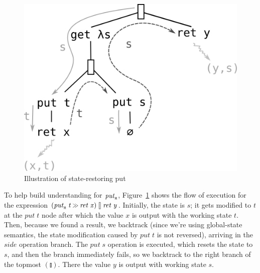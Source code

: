\documentclass{llncs}
\newcommand{\Varid}[1]{\mathit{#1}}
\let\Varid\mathit
\begin{document}
\begin{figure}
  \centering
  \includegraphics[scale=0.7]{sections/putR}
  \caption{Illustration of state-restoring put}
  \label{fig:putR}
\end{figure}

To help build understanding for \ensuremath{\Varid{put}_{\scaleobj{0.7}{\sf R}}}, Figure~\ref{fig:putR} shows the flow of
execution for the expression \ensuremath{(\Varid{put}_{\scaleobj{0.7}{\sf R}}\;\Varid{t}\mathbin{\hstretch{0.7}{>\!\!>}}\Varid{ret}\;\Varid{x})\mathbin{\talloblong}\Varid{ret}\;\Varid{y}}. Initially, the
state is \ensuremath{\Varid{s}}; it gets modified to \ensuremath{\Varid{t}} at the \ensuremath{\Varid{put}\;\Varid{t}} node after which the value
\ensuremath{\Varid{x}} is output with the working state \ensuremath{\Varid{t}}. Then, because we found a result, we
backtrack (since we're using global-state semantics, the state modification
caused by \ensuremath{\Varid{put}\;\Varid{t}} is not reversed), arriving in the \ensuremath{\Varid{side}} operation branch. The
\ensuremath{\Varid{put}\;\Varid{s}} operation is executed, which resets the state to \ensuremath{\Varid{s}}, and then the
branch immediately fails, so we backtrack to the right branch of the topmost
\ensuremath{(\talloblong)}. There the value \ensuremath{\Varid{y}} is output with working state \ensuremath{\Varid{s}}.
\end{document}

